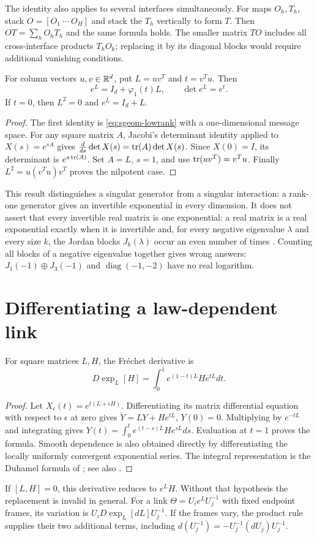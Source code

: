 The identity also applies to several interfaces simultaneously. For maps $O_h,T_h$, stack $O=[O_1\ \cdots\ O_H]$ and stack the $T_h$ vertically to form $T$. Then $OT=\sum_hO_hT_h$ and the same formula holds. The smaller matrix $TO$ includes all cross-interface products $T_hO_k$; replacing it by its diagonal blocks would require additional vanishing conditions.

For column vectors $u,v\in\mathbb R^d$, put $L=uv^T$ and $t=v^Tu$. Then
\begin{equation}
e^L=I_d+\varphi_1(t)L,\qquad
\det e^L=e^t.
\end{equation}
If $t=0$, then $L^2=0$ and $e^L=I_d+L$.
\begin{proof}
The first identity is \cref{eq:sgeom-lowrank} with a one-dimensional message space. For any square matrix $A$, Jacobi's determinant identity applied to $X(s)=e^{sA}$ gives
$\frac{d}{ds}\det X(s)=\operatorname{tr}(A)\det X(s)$.
Since $X(0)=I$, its determinant is $e^{s\operatorname{tr}(A)}$. Set $A=L$, $s=1$, and use $\operatorname{tr}(uv^T)=v^Tu$. Finally $L^2=u(v^Tu)v^T$ proves the nilpotent case.
\end{proof}
This result distinguishes a singular generator from a singular interaction: a rank-one generator gives an invertible exponential in every dimension. It does not assert that every invertible real matrix is one exponential: a real matrix is a real exponential exactly when it is invertible and, for every negative eigenvalue $\lambda$ and every size $k$, the Jordan blocks $J_k(\lambda)$ occur an even number of times \citep{Culver1966}. Counting all blocks of a negative eigenvalue together gives wrong answers: $J_1(-1)\oplus J_3(-1)$ and $\operatorname{diag}(-1,-2)$ have no real logarithm.

\section{Differentiating a law-dependent link}

For square matrices $L,H$, the Fr\'echet derivative is
\begin{equation}
D\exp_L[H]=\int_0^1e^{(1-t)L}He^{tL}dt.
\label{eq:sgeom-frechet}
\end{equation}
\begin{proof}
Let $X_\epsilon(t)=e^{t(L+\epsilon H)}$. Differentiating its matrix differential equation with respect to $\epsilon$ at zero gives
$\dot Y=LY+He^{tL}$, $Y(0)=0$.
Multiplying by $e^{-tL}$ and integrating gives
$Y(t)=\int_0^t e^{(t-s)L}He^{sL}ds$.
Evaluation at $t=1$ proves the formula. Smooth dependence is also obtained directly by differentiating the locally uniformly convergent exponential series. The integral representation is the Duhamel formula of \citet{Wilcox1967}; see also \citet[Chapter~10]{Higham2008}.
\end{proof}
If $[L,H]=0$, this derivative reduces to $e^LH$. Without that hypothesis the replacement is invalid in general. For a link $\Theta=U_i e^L U_j^{-1}$ with fixed endpoint frames, its variation is $U_iD\exp_L[dL]U_j^{-1}$. If the frames vary, the product rule supplies their two additional terms, including $d(U_j^{-1})=-U_j^{-1}(dU_j)U_j^{-1}$.

